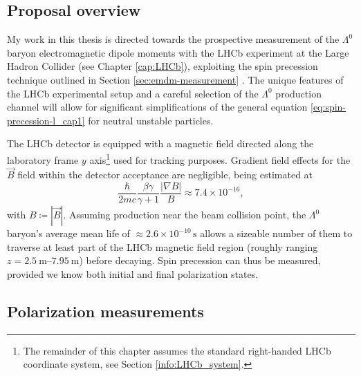 \subsection{Proposal overview}
My work in this thesis is directed towards the prospective measurement of the $\Lambda^0$ baryon electromagnetic dipole moments with the LHCb experiment at the Large Hadron Collider (see Chapter \ref{cap:LHCb}), exploiting the spin precession technique outlined in Section \ref{sec:emdm-measurement} \cite{EMDipoleSearch}.
The unique features of the LHCb experimental setup and a careful selection of the $\Lambda^0$ production channel will allow for significant simplifications of the general equation \eqref{eq:spin-precession-l_cap1} for neutral unstable particles.

The LHCb detector is equipped with a magnetic field directed along the laboratory frame $y$ axis\footnote{The remainder of this chapter assumes the standard right-handed LHCb coordinate system, see Section \ref{info:LHCb_system}.} used for tracking purposes. Gradient field effects for the $\vec{B}$ field within the detector acceptance are negligible, being estimated at \cite{EMDipoleSearch}
\begin{equation}
\frac{\hbar}{2mc} \frac{\beta\gamma}{\gamma+1} \frac{|\nabla B|}{B} \approx 7.4 \times {10}^{-16},
\end{equation}
with $B \coloneqq |\vec{B}|$.
Assuming production near the beam collision point, the $\Lambda^0$ baryon's average mean life of $\approx 2.6 \times {10}^{-10}\, \si{\second}$ \cite{PDG} allows a sizeable number of them to traverse at least part of the LHCb magnetic field region (roughly ranging $z=\SI{2.5}{\meter}$--$\SI{7.95}{\meter}$) before decaying.
Spin precession can thus be measured, provided we know both initial and final polarization states.


\subsection{Polarization measurements}

